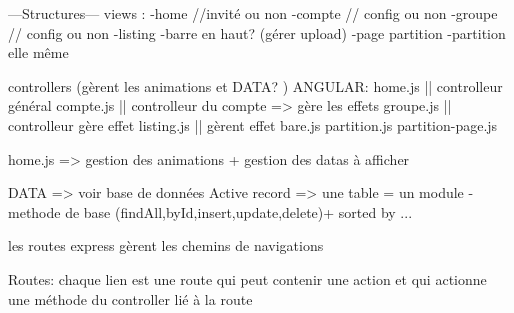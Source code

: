 ---Structures---
views : 
-home //invité ou non
-compte // config ou non
-groupe // config ou non
-listing
-barre en haut? (gérer upload)
-page partition
-partition elle même

controllers (gèrent les animations et DATA? ) ANGULAR:
home.js || controlleur général
compte.js || controlleur du compte => gère les effets
groupe.js || controlleur gère effet
listing.js || gèrent effet
bare.js
partition.js
partition-page.js


home.js => gestion des animations + gestion des datas à afficher



DATA => voir base de données
Active record => une table = un module
-methode de base (findAll,byId,insert,update,delete)+ sorted by ... 

les routes express gèrent les chemins de navigations 


Routes:
chaque lien est une route qui peut contenir une action et qui actionne une méthode du controller lié à la route
